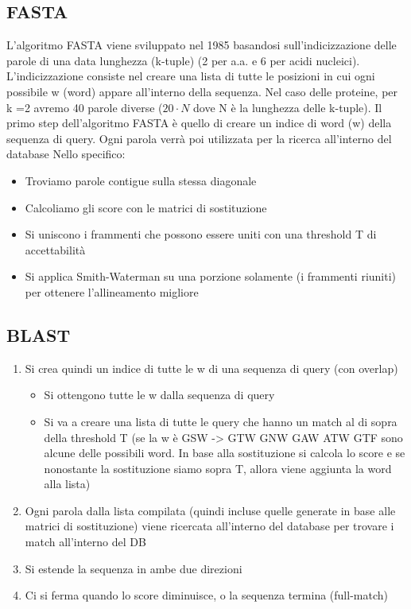 \documentclass[11pt]{article}
\begin{document}
\subsection{FASTA}
\label{sec:org36a67ff}
L'algoritmo FASTA viene sviluppato nel 1985 basandosi sull'indicizzazione delle parole di una data lunghezza (k-tuple) (2 per a.a. e 6 per acidi nucleici). L'indicizzazione consiste nel creare una lista di tutte le posizioni in cui ogni possibile w (word) appare all'interno della sequenza. Nel caso delle proteine, per k =2 avremo 40 parole diverse (\(20\cdot N\) dove N è la lunghezza delle k-tuple).
Il primo step dell'algoritmo FASTA è quello di creare un indice di word (w) della sequenza di query. Ogni parola verrà poi utilizzata per la ricerca all'interno del database
Nello specifico:
\begin{itemize}
\item Troviamo parole contigue sulla stessa diagonale
\item Calcoliamo gli score con le matrici di sostituzione
\item Si uniscono i frammenti che possono essere uniti con una threshold T di accettabilità
\item Si applica Smith-Waterman su una porzione solamente (i frammenti riuniti) per ottenere l'allineamento migliore
\end{itemize}
\subsection{BLAST}
\label{sec:orge80e566}
\begin{enumerate}
\item Si crea quindi un indice di tutte le w di una sequenza di query (con overlap)
\begin{itemize}
\item Si ottengono tutte le w dalla sequenza di query
\item Si va a creare una lista di tutte le query che hanno un match al di sopra della threshold T (se la w è GSW -> GTW GNW GAW ATW GTF sono alcune delle possibili word. In base alla sostituzione si calcola lo score e se nonostante la sostituzione siamo sopra T, allora viene aggiunta la word alla lista)
\end{itemize}
\item Ogni parola dalla lista compilata (quindi incluse quelle generate in base alle matrici di sostituzione) viene ricercata all'interno del database per trovare i match all'interno del DB
\item Si estende la sequenza in ambe due direzioni
\item Ci si ferma quando lo score diminuisce, o la sequenza termina (full-match)
\end{enumerate}
\end{document}
